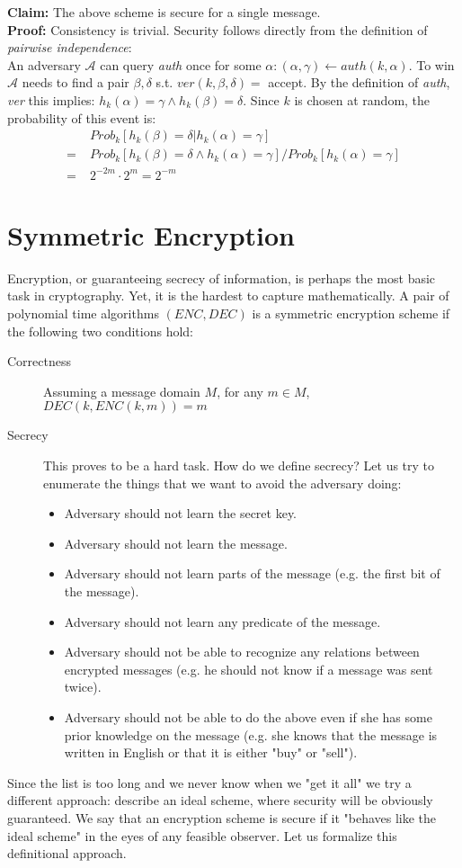 \documentclass[12pt]{article}
\newcommand{\adv}{\mathcal{A}}
\newcommand{\pr}{Prob}
\begin{document}
\textbf{Claim:} The above scheme is secure for a single message.\\
\textbf{Proof:} Consistency is trivial. Security follows directly from the definition of \textit{pairwise independence}:\\ An adversary $\adv$ can query \textit{auth} once for some $\alpha: (\alpha,\gamma) \leftarrow auth(k,\alpha)$. To win $\adv$ needs to find a pair $\beta, \delta$ s.t. $ver(k,\beta,\delta) =$ accept. By the definition of \textit{auth}, \textit{ver} this implies: $h_k(\alpha) = \gamma \wedge h_k(\beta) = \delta$. Since $k$ is chosen at random, the probability of this event is:
\begin{align*}
  & \; \pr_k[h_k(\beta) = \delta | h_k(\alpha) = \gamma]\\
=&\; \pr_k[h_k(\beta) = \delta \wedge h_k(\alpha) = \gamma]/ \pr_k[h_k(\alpha) = \gamma]\\
=&\; 2^{-2m} \cdot 2^m = 2^{-m}
\end{align*}

\section{Symmetric Encryption}
Encryption, or guaranteeing secrecy of information, is perhaps the most basic task in cryptography. Yet, it is the hardest to capture mathematically. A pair of polynomial time algorithms $(ENC,DEC)$ is a symmetric encryption scheme if the following two conditions hold:
\begin{description}
\item[Correctness] Assuming a message domain $M$, for any $m \in M$, $DEC(k,ENC(k,m))= m$
\item[Secrecy] This proves to be a hard task. How do we define secrecy? Let us try to enumerate the things that we want to avoid the adversary doing:
\begin{itemize}
\item Adversary should not learn the secret key.
\item Adversary should not learn the message.
\item Adversary should not learn parts of the message (e.g. the first bit of the message).
\item Adversary should not learn any predicate of the message.
\item Adversary should not be able to recognize any relations between encrypted messages (e.g. he should not know if a message was sent twice).
\item Adversary should not be able to do the above even if she has some prior knowledge on the message (e.g. she knows that the message is written in English or that it is either "buy" or "sell").
\end{itemize} 
\end{description}
Since the list is too long and we never know when we "get it all" we try a different approach: describe an ideal scheme, where security will be obviously guaranteed. We say that an encryption scheme is secure if it "behaves like the ideal scheme" in the eyes of any feasible observer. Let us formalize this definitional approach.
\end{document}
